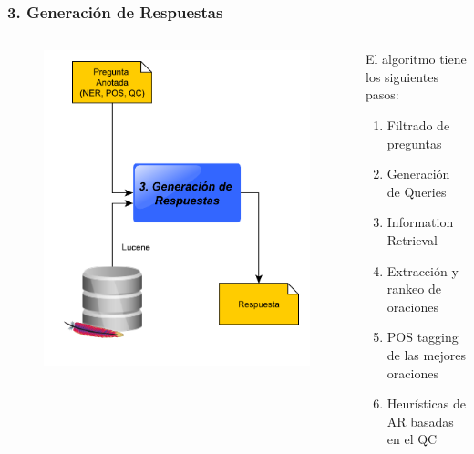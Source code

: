 \begin{frame}
\frametitle{3. Generación de Respuestas}
  \begin{columns}[T] %
\begin{column}{.38\textwidth}
      \begin{figure}
          \includegraphics[scale=0.3]{graficos/pipeline-ar}
      \end{figure}
\end{column}%
\hfill%
\begin{column}{.58\textwidth}
El algoritmo tiene los siguientes pasos:
  \begin{enumerate}
    \item Filtrado de preguntas
    \item Generación de Queries
    \item Information Retrieval
    \item Extracción y rankeo de oraciones
    \item POS tagging de las mejores oraciones
    \item Heurísticas de AR basadas en el QC
  \end{enumerate}
\end{column}%
\end{columns}
\end{frame}

